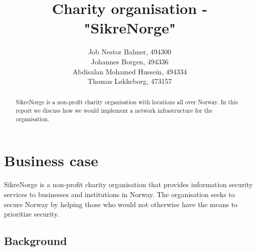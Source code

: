 

\title{Charity organisation - "SikreNorge"}

\author{
  Job Nestor Bahner, 494300\\
  Johannes Borgen, 494336\\
  Abdisalan Mohamed Hussein, 494334\\
  Thomas Løkkeborg, 473157\\
}



\maketitle

\begin{abstract}
SikreNorge is a non-profit charity organisation with locations all over Norway. In this report we discuss how we would implement a network infrastructure for the organisation.
\end{abstract}

\thispagestyle{empty}

\clearpage
{}
\setcounter{page}{1}
\tableofcontents

\clearpage
{}


\section{Business case}

SikreNorge is a non-profit charity organisation that provides information security services to businesses and institutions in Norway. The organisation seeks to secure Norway by helping those who would not otherwise have the means to prioritize security.

\subsection{Background} %


